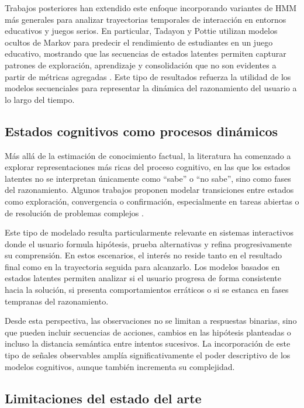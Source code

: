 \documentclass[../main.tex]{subfiles}
\begin{document}
Trabajos posteriores han extendido este enfoque incorporando variantes de HMM más generales para analizar trayectorias temporales de interacción en entornos educativos y juegos serios. En particular, Tadayon y Pottie utilizan modelos ocultos de Markov para predecir el rendimiento de estudiantes en un juego educativo, mostrando que las secuencias de estados latentes permiten capturar patrones de exploración, aprendizaje y consolidación que no son evidentes a partir de métricas agregadas \cite{tadayon2019predictingstudentperformanceeducational}. Este tipo de resultados refuerza la utilidad de los modelos secuenciales para representar la dinámica del razonamiento del usuario a lo largo del tiempo.

\subsection{Estados cognitivos como procesos dinámicos}

Más allá de la estimación de conocimiento factual, la literatura ha comenzado a explorar representaciones más ricas del proceso cognitivo, en las que los estados latentes no se interpretan únicamente como “sabe” o “no sabe”, sino como fases del razonamiento. Algunos trabajos proponen modelar transiciones entre estados como exploración, convergencia o confirmación, especialmente en tareas abiertas o de resolución de problemas complejos \cite{Rafferty2016ModelingCognitiveStates}.

Este tipo de modelado resulta particularmente relevante en sistemas interactivos donde el usuario formula hipótesis, prueba alternativas y refina progresivamente su comprensión. En estos escenarios, el interés no reside tanto en el resultado final como en la trayectoria seguida para alcanzarlo. Los modelos basados en estados latentes permiten analizar si el usuario progresa de forma consistente hacia la solución, si presenta comportamientos erráticos o si se estanca en fases tempranas del razonamiento.

Desde esta perspectiva, las observaciones no se limitan a respuestas binarias, sino que pueden incluir secuencias de acciones, cambios en las hipótesis planteadas o incluso la distancia semántica entre intentos sucesivos. La incorporación de este tipo de señales observables amplía significativamente el poder descriptivo de los modelos cognitivos, aunque también incrementa su complejidad.

\subsection{Limitaciones del estado del arte}
\end{document}
